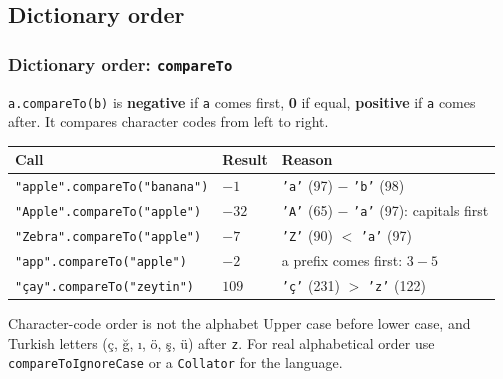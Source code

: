 \documentclass[aspectratio=169,10pt,compress]{beamer}
\begin{document}
\subsection[Order]{Dictionary order}




\begin{frame}[t,fragile] \frametitle{Dictionary order: \texttt{compareTo}}
  \small \texttt{a.compareTo(b)} is \textbf{negative} if \texttt{a} comes first, \textbf{0} if equal, \textbf{positive} if \texttt{a} comes after.
  It compares character codes from left to right.

  \vspace{0.4em}
  \begin{tabular}{@{}L{0.32\textwidth}L{0.08\textwidth}L{0.5\textwidth}@{}}
    \toprule
    \textbf{Call}                                  & \textbf{Result} & \textbf{Reason} \\
    \midrule
    \texttt{"apple".compareTo("banana")}           & $-1$  & \texttt{'a'} (97) $-$ \texttt{'b'} (98) \\
    \texttt{"Apple".compareTo("apple")}            & $-32$ & \texttt{'A'} (65) $-$ \texttt{'a'} (97): capitals first \\
    \texttt{"Zebra".compareTo("apple")}            & $-7$  & \texttt{'Z'} (90) $<$ \texttt{'a'} (97) \\
    \texttt{"app".compareTo("apple")}              & $-2$  & a prefix comes first: $3 - 5$ \\
    \texttt{"çay".compareTo("zeytin")}             & $109$ & \texttt{'ç'} (231) $>$ \texttt{'z'} (122) \\
    \bottomrule
  \end{tabular}

  \vspace{0.6em}
  \begin{alertblock}{Character-code order is not the alphabet}
    \small Upper case before lower case, and Turkish letters (ç, ğ, ı, ö, ş, ü) after \texttt{z}.
    For real alphabetical order use \texttt{compareToIgnoreCase} or a \texttt{Collator} for the language.
  \end{alertblock}
\end{frame}




\end{document}
